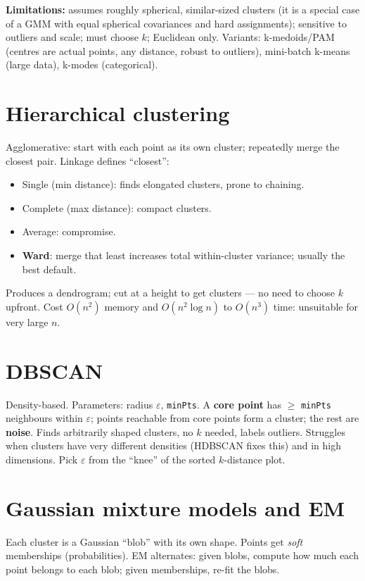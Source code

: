 \textbf{Limitations:} assumes roughly spherical, similar-sized clusters (it is a special case of a GMM with equal spherical covariances and hard assignments); sensitive to outliers and scale; must choose $k$; Euclidean only. Variants: k-medoids/PAM (centres are actual points, any distance, robust to outliers), mini-batch k-means (large data), k-modes (categorical).

\section{Hierarchical clustering}
Agglomerative: start with each point as its own cluster; repeatedly merge the closest pair. Linkage defines ``closest'':
\begin{itemize}
  \item Single (min distance): finds elongated clusters, prone to chaining.
  \item Complete (max distance): compact clusters.
  \item Average: compromise.
  \item \textbf{Ward}: merge that least increases total within-cluster variance; usually the best default.
\end{itemize}
Produces a dendrogram; cut at a height to get clusters --- no need to choose $k$ upfront. Cost $O(n^2)$ memory and $O(n^2\log n)$ to $O(n^3)$ time: unsuitable for very large $n$.

\section{DBSCAN}
Density-based. Parameters: radius $\varepsilon$, \texttt{minPts}. A \textbf{core point} has $\ge$ \texttt{minPts} neighbours within $\varepsilon$; points reachable from core points form a cluster; the rest are \textbf{noise}. Finds arbitrarily shaped clusters, no $k$ needed, labels outliers. Struggles when clusters have very different densities (HDBSCAN fixes this) and in high dimensions. Pick $\varepsilon$ from the ``knee'' of the sorted $k$-distance plot.

\section{Gaussian mixture models and EM}
\begin{intuition}
Each cluster is a Gaussian ``blob'' with its own shape. Points get \emph{soft} memberships (probabilities). EM alternates: given blobs, compute how much each point belongs to each blob; given memberships, re-fit the blobs.
\end{intuition}

